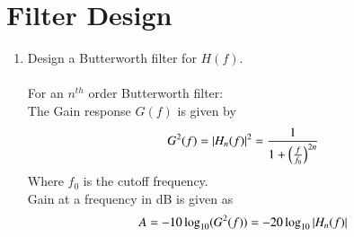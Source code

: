 \documentclass[journal,12pt,twocolumn]{IEEEtran}
\renewcommand\thesection{\arabic{section}}
\begin{document}
\section{Filter Design}
\begin{enumerate}[label=\thesection.\arabic*
,ref=\thesection.\theenumi]
\item Design a Butterworth filter for $H(f)$.\\
\solution\\
For an $n^{th}$ order Butterworth filter:\\
The Gain response $G(f)$ is given by\\
\begin{align}
G^2(f) = |H_n(f)|^2 = \frac{1}{1 + \left(\frac{f}{f_0}\right)^{2n}}
\end{align}
Where $f_0$ is the cutoff frequency.\\
Gain at a frequency in dB is given as
\begin{align}
	A = -10\log_{10}(G^2(f)) = -20\log_{10}\left\vert H_n(f)\right\vert
	\label{eq:loss}
\end{align}


\end{enumerate}
\end{document}
